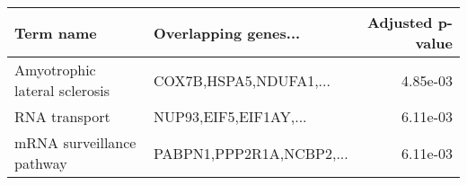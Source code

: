 \begin{tabular}{llr}
\toprule
                    Term name &     Overlapping genes... &  Adjusted p-value \\
\midrule
Amyotrophic lateral sclerosis &   COX7B,HSPA5,NDUFA1,... &          4.85e-03 \\
                RNA transport &    NUP93,EIF5,EIF1AY,... &          6.11e-03 \\
    mRNA surveillance pathway & PABPN1,PPP2R1A,NCBP2,... &          6.11e-03 \\
\bottomrule
\end{tabular}
